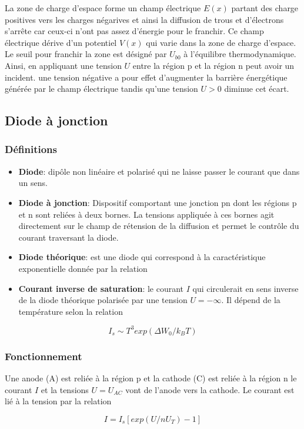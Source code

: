 \documentclass{book}
\begin{document}
            La zone de charge d'espace forme un champ électrique $E(x)$ partant des charge positives vers les charges négarives et ainsi la diffusion de trous et d'électrons s'arrête car ceux-ci n'ont pas assez d'énergie pour le franchir. Ce champ électrique dérive d'un potentiel $V(x)$ qui varie dans la zone de charge d'espace. Le seuil pour franchir la zone est désigné par $U_{b0}$ à l'équilibre thermodynamique. Ainsi, en appliquant une tension $U$ entre la région p et la région n peut avoir un incident. une tension négative a pour effet d'augmenter la barrière énergétique générée par le champ électrique tandis qu'une tension $U > 0$ diminue cet écart.\cite{Jonction}

            \subsection{Diode à jonction}

                \subsubsection{Définitions}
                    \begin{itemize}
                        \item \textbf{Diode}: dipôle non linéaire et polarisé qui ne laisse passer le courant que dans un sens.
                        \item \textbf{Diode à jonction}: Dispositif comportant une jonction pn dont les régions p et n sont reliées à deux bornes. La tensions appliquée à ces bornes agit directement sur le champ de rétension de la diffusion et permet le contrôle du courant traversant la diode.
                        \item \textbf{Diode théorique}: est une diode qui correspond à la caractéristique exponentielle donnée par la relation 
                        \item \textbf{Courant inverse de saturation}: le courant $I$ qui circulerait en sens inverse de la diode théorique polarisée par une tension $U =-\infty$. Il dépend de la température selon la relation
                    \end{itemize}


                        \begin{equation}
                            I_s \sim T^3exp(\Delta W_0/k_BT)
                        \end{equation}
        
                \subsubsection{Fonctionnement}
                    Une anode (A) est reliée à la région p et la cathode (C) est reliée à la région n le courant $I$ et la tensions $U= U_{AC}$ vont de l'anode vers la cathode. Le courant est lié à la tension par la relation 

                    \begin{equation}
                        I = I_s[exp(U/nU_T)-1]
                    \end{equation}

    \printbibliography
\end{document}
